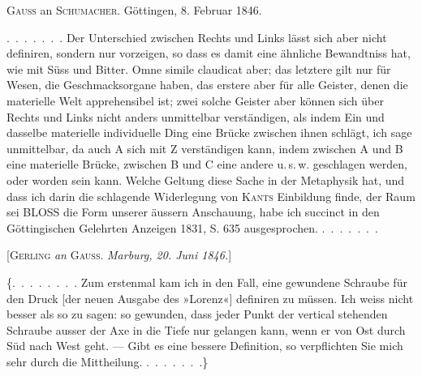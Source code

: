 %
\begin{center}
\textsc{Gauss} an \textsc{Schumacher}. G\"ottingen, 8. Februar 1846.
\end{center}

\mbox{.\ .\ .\ .\ .\ .\ .} Der Unterschied zwischen Rechts und Links l\"asst sich aber nicht definiren, sondern nur vorzeigen, so dass es damit eine \"ahnliche Bewandtniss hat, wie mit S\"uss und Bitter. Omne simile claudicat aber; das letztere gilt nur f\"ur Wesen, die Geschmacksorgane haben, das erstere aber f\"ur alle Geister, denen die materielle Welt apprehensibel ist; zwei solche Geister aber k\"onnen sich \"uber Rechts und Links nicht anders unmittelbar verst\"andigen, als indem Ein und dasselbe materielle individuelle Ding eine Br\"ucke zwischen ihnen schl\"agt, ich sage unmittelbar, da auch A sich mit Z verst\"andigen kann, indem zwischen A und B eine materielle Br\"ucke, zwischen B und C eine andere u.\,s.\,w. geschlagen werden, oder worden sein kann. Welche Geltung diese Sache in der Metaphysik hat, und dass ich darin die schlagende Widerlegung von \textsc{Kants} Einbildung finde, der Raum sei BLOSS die Form unserer \"aussern Anschauung, habe ich succinct in den G\"ottingischen Gelehrten Anzeigen 1831, S. 635 ausgesprochen. \mbox{.\ .\ .\ .\ .\ .\ .}

\par\bigskip

\begin{center}
[\textsc{Gerling} \emph{an} \textsc{Gauss}. \emph{Marburg, 20. Juni 1846.}]
\end{center}

\{\mbox{.\ .\ .\ .\ .\ .\ .\ .} Zum erstenmal kam ich in den Fall, eine gewundene Schraube f\"ur den Druck [der neuen Ausgabe des »Lorenz«] definiren zu m\"ussen. Ich weiss nicht besser als so zu sagen: so gewunden, dass jeder Punkt der vertical stehenden Schraube ausser der Axe in die Tiefe nur gelangen kann, wenn er von Ost durch S\"ud nach West geht. --- Gibt es eine bessere Definition, so verpflichten Sie mich sehr durch die Mittheilung. \mbox{.\ .\ .\ .\ .\ .\ .}\}

\par\bigskip
